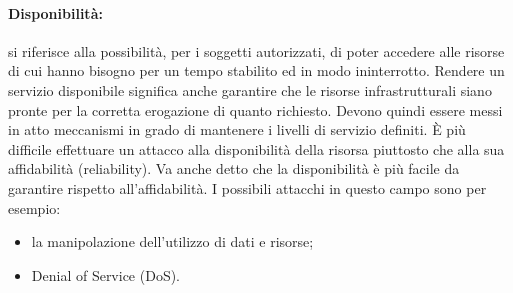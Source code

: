 \paragraph{Disponibilità:}
si riferisce alla possibilità, per i soggetti autorizzati, di poter accedere
alle risorse di cui hanno bisogno per un tempo stabilito ed in modo ininterrotto.
Rendere un servizio disponibile significa anche garantire che le risorse
infrastrutturali siano pronte per la corretta erogazione di quanto richiesto.
Devono quindi essere messi in atto meccanismi in grado di mantenere i livelli di
servizio definiti.
È più difficile effettuare un attacco alla disponibilità della risorsa piuttosto
che alla sua affidabilità (reliability). Va anche detto che la disponibilità è
più facile da garantire rispetto all'affidabilità.
I possibili attacchi in questo campo sono per esempio:

\begin{itemize}
    \item la manipolazione dell'utilizzo di dati e risorse;
    \item Denial of Service (DoS).
\end{itemize}